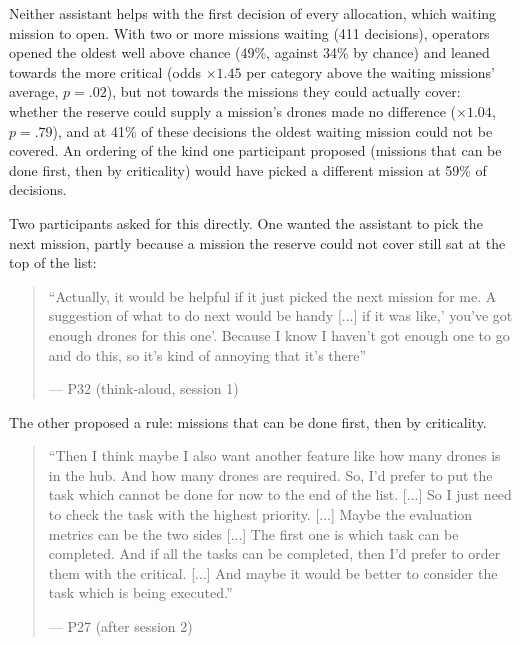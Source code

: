 
\label{sec:qual:new-jobs:queue-order}
Neither assistant helps with the first decision of every allocation, which waiting mission to open. With two or more missions waiting (411 decisions), operators opened the oldest well above chance (49\%, against 34\% by chance) and leaned towards the more critical (odds $\times 1.45$ per category above the waiting missions' average, $p = .02$), but not towards the missions they could actually cover: whether the reserve could supply a mission's drones made no difference ($\times 1.04$, $p = .79$), and at 41\% of these decisions the oldest waiting mission could not be covered. An ordering of the kind one participant proposed (missions that can be done first, then by criticality) would have picked a different mission at 59\% of decisions.

{\color{blue}Two participants asked for this directly. One wanted the assistant to pick the next mission, partly because a mission the reserve could not cover still sat at the top of the list:}

\begin{quote}\small
``Actually, it would be helpful if it just picked the next mission for me. A suggestion of what to do next would be handy [...] if it was like,' you've got enough drones for this one'. Because I know I haven't got enough one to go and do this, so it's kind of annoying that it's there''\par\hfill--- P32 (think-aloud, session 1)
\end{quote}

{\color{blue}The other proposed a rule: missions that can be done first, then by criticality.}

\begin{quote}\small
``Then I think maybe I also want another feature like how many drones is in the hub. And how many drones are required. So, I'd prefer to put the task which cannot be done for now to the end of the list. [...] So I just need to check the task with the highest priority. [...] Maybe the evaluation metrics can be the two sides [...] The first one is which task can be completed. And if all the tasks can be completed, then I'd prefer to order them with the critical. [...] And maybe it would be better to consider the task which is being executed.''\par\hfill--- P27 (after session 2)
\end{quote}

